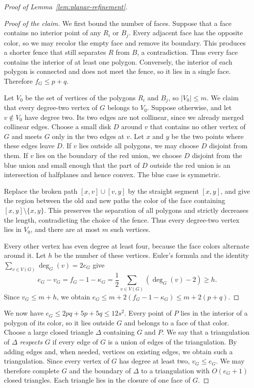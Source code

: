 \documentclass[11pt]{article}
\theoremstyle{definition}
\newenvironment{poc}{\begin{proof}[Proof of the claim]\renewcommand*{\qedsymbol}{\(\blacksquare\)}}{\end{proof}}
\newcommand*{\abs}[1]{\lvert#1\rvert}
\begin{document}
\begin{proof}[Proof of Lemma~\ref{lem:planar-refinement}]
\begin{poc}
We first bound the number of faces. Suppose that a face contains no interior point of any \(R_{i}\) or \(B_{j}\). Every adjacent face has the opposite color, so we may recolor the empty face and remove its boundary. This produces a shorter fence that still separates \(R\) from \(B\), a contradiction. Thus every face contains the interior of at least one polygon. Conversely, the interior of each polygon is connected and does not meet the fence, so it lies in a single face. Therefore \(f_{G}\le p+q\).

Let \(V_{0}\) be the set of vertices of the polygons \(R_{i}\) and \(B_{j}\), so \(\abs{V_{0}}\le m\). We claim that every degree-two vertex of \(G\) belongs to \(V_{0}\). Suppose otherwise, and let \(v\notin V_{0}\) have degree two. Its two edges are not collinear, since we already merged collinear edges. Choose a small disk \(D\) around \(v\) that contains no other vertex of \(G\) and meets \(G\) only in the two edges at \(v\). Let \(x\) and \(y\) be the two points where these edges leave \(D\). If \(v\) lies outside all polygons, we may choose \(D\) disjoint from them. If \(v\) lies on the boundary of the red union, we choose \(D\) disjoint from the blue union and small enough that the part of \(D\) outside the red union is an intersection of halfplanes and hence convex. The blue case is symmetric.

Replace the broken path \([x,v]\cup[v,y]\) by the straight segment \([x,y]\), and give the region between the old and new paths the color of the face containing \([x,y]\setminus\{x,y\}\). This preserves the separation of all polygons and strictly decreases the length, contradicting the choice of the fence. Thus every degree-two vertex lies in \(V_{0}\), and there are at most \(m\) such vertices.

Every other vertex has even degree at least four, because the face colors alternate around it. Let \(h\) be the number of these vertices. Euler's formula and the identity \(\sum_{v\in V(G)}\deg_{G}(v)=2e_{G}\) give
\[
e_{G}-v_{G}=f_{G}-1-\kappa_{G}=\frac{1}{2}\sum_{v\in V(G)}(\deg_{G}(v)-2)\ge h.
\]
Since \(v_{G}\le m+h\), we obtain \(e_{G}\le m+2(f_{G}-1-\kappa_{G})\le m+2(p+q)\).
\end{poc}

We now have \(e_{G}\le2pq+5p+5q\le12s^{2}\). Every point of \(P\) lies in the interior of a polygon of its color, so it lies outside \(G\) and belongs to a face of that color. Choose a large closed triangle \(\Delta\) containing \(G\) and \(P\). We say that a triangulation of \(\Delta\) \emph{respects \(G\)} if every edge of \(G\) is a union of edges of the triangulation. By adding edges and, when needed, vertices on existing edges, we obtain such a triangulation. Since every vertex of \(G\) has degree at least two, \(v_{G}\le e_{G}\). We may therefore complete \(G\) and the boundary of \(\Delta\) to a triangulation with \(O(e_{G}+1)\) closed triangles. Each triangle lies in the closure of one face of \(G\).


\end{proof}
\end{document}
